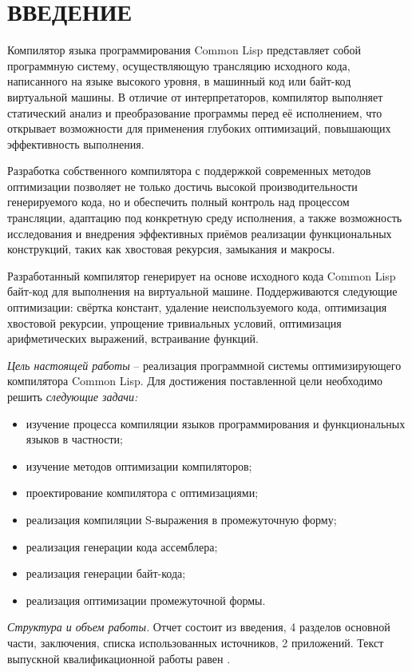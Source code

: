 \section*{ВВЕДЕНИЕ}

Компилятор языка программирования Common Lisp представляет собой программную систему, осуществляющую трансляцию исходного кода, написанного на языке высокого уровня, в машинный код или байт-код виртуальной машины. В отличие от интерпретаторов, компилятор выполняет статический анализ и преобразование программы перед её исполнением, что открывает возможности для применения глубоких оптимизаций, повышающих эффективность выполнения.

Разработка собственного компилятора с поддержкой современных методов оптимизации позволяет не только достичь высокой производительности генерируемого кода, но и обеспечить полный контроль над процессом трансляции, адаптацию под конкретную среду исполнения, а также возможность исследования и внедрения эффективных приёмов реализации функциональных конструкций, таких как хвостовая рекурсия, замыкания и макросы.

Разработанный компилятор генерирует на основе исходного кода Common Lisp байт-код для выполнения на виртуальной машине. Поддерживаются следующие оптимизации: свёртка констант, удаление неиспользуемого кода, оптимизация хвостовой рекурсии, упрощение тривиальных условий, оптимизация арифметических выражений, встраивание функций.

\emph{Цель настоящей работы} -- реализация программной системы оптимизирующего компилятора Common Lisp. Для достижения поставленной цели необходимо решить \emph{следующие задачи:}
\begin{itemize}
\item изучение процесса компиляции языков программирования и функциональных языков в частности;
\item изучение методов оптимизации компиляторов;
\item проектирование компилятора с оптимизациями;
\item реализация компиляции S-выражения в промежуточную форму;
\item реализация генерации кода ассемблера;
\item реализация генерации байт-кода;
\item реализация оптимизации промежуточной формы.
\end{itemize}

\emph{Структура и объем работы.} Отчет состоит из введения, 4 разделов основной части, заключения, списка использованных источников, 2 приложений. Текст выпускной квалификационной работы равен .

